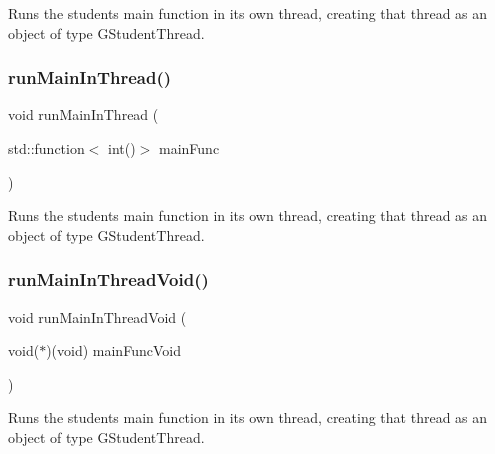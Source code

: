 Runs the student\textquotesingle{}s main function in its own thread, creating that thread as an object of type G\+Student\+Thread. 

\mbox{\label{namespacestanfordcpplib_a371bf0cfbf0eedf6a653e89a563d6a40}} 
\subsubsection{\texorpdfstring{run\+Main\+In\+Thread()}{runMainInThread()}\hspace{0.1cm}{\footnotesize\ttfamily [2/2]}}
{\footnotesize\ttfamily void run\+Main\+In\+Thread (\begin{DoxyParamCaption}\item[{std\+::function$<$ int()$>$}]{main\+Func }\end{DoxyParamCaption})}



Runs the student\textquotesingle{}s main function in its own thread, creating that thread as an object of type G\+Student\+Thread. 

\mbox{\label{namespacestanfordcpplib_a647c2bc343e4e0d30483590a58ad3884}} 
\subsubsection{\texorpdfstring{run\+Main\+In\+Thread\+Void()}{runMainInThreadVoid()}\hspace{0.1cm}{\footnotesize\ttfamily [1/2]}}
{\footnotesize\ttfamily void run\+Main\+In\+Thread\+Void (\begin{DoxyParamCaption}\item[{void($\ast$)(void)}]{main\+Func\+Void }\end{DoxyParamCaption})}



Runs the student\textquotesingle{}s main function in its own thread, creating that thread as an object of type G\+Student\+Thread. 

\mbox{\label{namespacestanfordcpplib_a050c409518de97f2a63cac9728456072}} 
